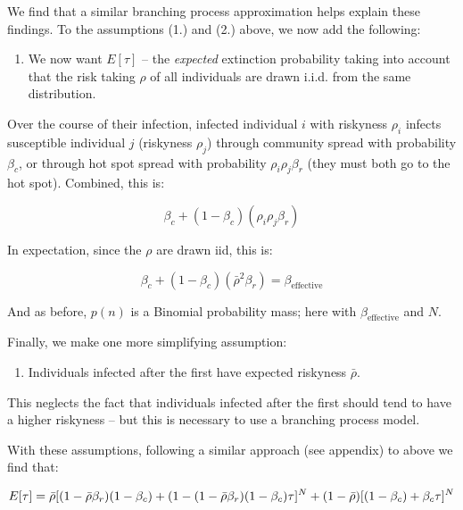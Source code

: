 We find that a similar branching process approximation helps explain
these findings. To the assumptions (1.) and (2.) above, we now add the
following:

\begin{enumerate}
\def\labelenumi{\arabic{enumi}.}
\setcounter{enumi}{2}
\tightlist
\item
  We now want \(E[\tau]\) -- the \emph{expected} extinction probability
  taking into account that the risk taking \(\rho\) of all individuals
  are drawn i.i.d. from the same distribution.
\end{enumerate}

Over the course of their infection, infected individual \(i\) with
riskyness \(\rho_i\) infects susceptible individual \(j\) (riskyness
\(\rho_j\)) through community spread with probability \(\beta_c\), or
through hot spot spread with probability \(\rho_i \rho_j \beta_r\) (they
must both go to the hot spot). Combined, this is:

\[\beta_c + (1 - \beta_c)(\rho_i \rho_j \beta_r)\]

In expectation, since the \(\rho\) are drawn iid, this is:

\[\beta_c + (1 - \beta_c)(\bar\rho^2 \beta_r) = \beta_{\text{effective}}\]

And as before, \(p(n)\) is a Binomial probability mass; here with
\(\beta_{\text{effective}}\) and \(N\).

Finally, we make one more simplifying assumption:

\begin{enumerate}
\def\labelenumi{\arabic{enumi}.}
\setcounter{enumi}{3}
\tightlist
\item
  Individuals infected after the first have expected riskyness
  \(\bar\rho\).
\end{enumerate}

This neglects the fact that individuals infected after the first should
tend to have a higher riskyness -- but this is necessary to use a
branching process model.

With these assumptions, following a similar approach (see appendix) to
above we find that:

\[E[\tau] = \bar\rho [(1 - \bar\rho \beta_r)(1 - \beta_c) + 
                (1 - (1 - \bar\rho \beta_r)(1 - \beta_c) \tau]^N + 
   (1 - \bar\rho)[(1 - \beta_c) + \beta_c \tau]^N\\\]

